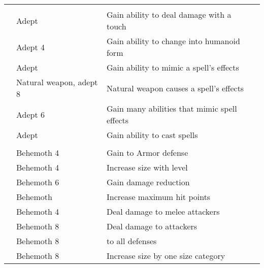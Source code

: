\begin{longtabuwrapper}
\begin{longtabu}{>{\lcol}p{10em} >{\lcol}p{15em} >{\lcol}X >{\lcol}p{3em}}
            \midrule
            \label{Adept Traits} &  &  &  \\
             & Adept & Gain ability to deal damage with a touch &  \\
             & Adept 4 & Gain ability to change into humanoid form &  \\
             & Adept & Gain ability to mimic a spell's effects &  \\
             & Natural weapon, adept 8 & Natural weapon causes a spell's effects &  \\
             & Adept 6 & Gain many abilities that mimic spell effects &  \\
             & Adept & Gain ability to cast spells &  \\

            \midrule
            \label{Behemoth Traits} &  &  &  \\
             & Behemoth 4 & Gain  to Armor defense &  \\
             & Behemoth 4 & Increase size with level &  \\
             & Behemoth 6 & Gain damage reduction &  \\
             & Behemoth & Increase maximum hit points &  \\
             & Behemoth 4 & Deal damage to melee attackers &  \\
             & Behemoth 8 & Deal damage to attackers &  \\
             & Behemoth 8 &  to all defenses &  \\
             & Behemoth 8 & Increase size by one size category &  \\


\end{longtabu}
\end{longtabuwrapper}
